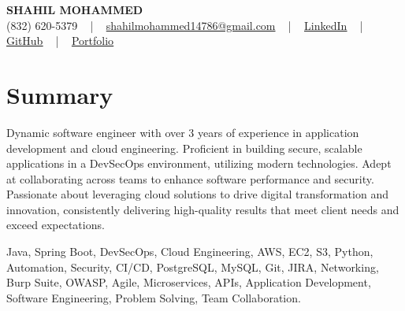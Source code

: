 \documentclass[letterpaper,10pt]{article}
\begin{document}
\begin{center}
    {\fontsize{14pt}{12pt}\selectfont \textbf{\MakeUppercase{Shahil Mohammed}}}\\ \vspace{2pt}
    \fontsize{10pt}{12pt}\selectfont (832) 620-5379 ~ | ~ \href{mailto:shahilmohammed14786@gmail.com}{shahilmohammed14786@gmail.com} ~ | ~  
    \href{https://www.linkedin.com/in/shahil-mohammed-9652931a1/}{\color{blue}\underline{LinkedIn}}  ~ | ~ 
    \href{https://github.com/freakbeast14}{\color{blue}\underline{GitHub}} ~ | ~ 
    \href{https://shahil-mohammed.netlify.app/}{\color{blue}\underline{Portfolio}}
    \vspace{-8pt}
\end{center}

\section{Summary}
\vspace{-2pt}\fontsize{8pt}{9pt}\selectfont
Dynamic software engineer with over 3 years of experience in application development and cloud engineering. Proficient in building secure, scalable applications in a DevSecOps environment, utilizing modern technologies. Adept at collaborating across teams to enhance software performance and security. Passionate about leveraging cloud solutions to drive digital transformation and innovation, consistently delivering high-quality results that meet client needs and exceed expectations.
 \vspace{-5pt}
 
{\fontsize{1pt}{1pt}\selectfont\color{white}
Java, Spring Boot, DevSecOps, Cloud Engineering, AWS, EC2, S3, Python, Automation, Security, CI/CD, PostgreSQL, MySQL, Git, JIRA, Networking, Burp Suite, OWASP, Agile, Microservices, APIs, Application Development, Software Engineering, Problem Solving, Team Collaboration.
}
\vspace{-8pt}

\vspace{-2pt}
\end{document}

